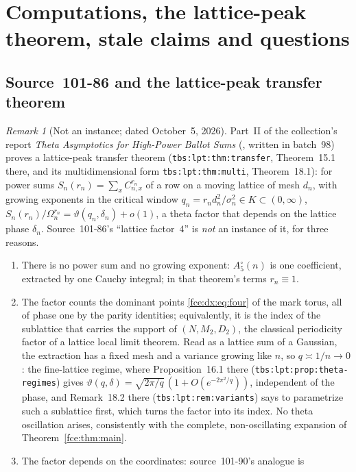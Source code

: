 \documentclass[11pt,a4paper]{article}
\numberwithin{equation}{section}
\theoremstyle{definition}\newtheorem{definition}[theorem]{Definition}
\theoremstyle{remark}\newtheorem{remark}[theorem]{Remark}
\begin{document}
\section{Computations, the lattice-peak theorem, stale claims and questions}\label{fce:dx:sec:end}
\subsection{Source~101-86 and the lattice-peak transfer theorem}\label{fce:dx:sec:lattice}
\begin{remark}[Not an instance; dated October~5, 2026]\label{fce:dx:rem:lattice}
Part~II of the collection's report \emph{Theta Asymptotics for High-Power
Ballot Sums} (,
written in batch~98) proves a lattice-peak transfer theorem
(\texttt{tbs:lpt:thm:transfer}, Theorem~15.1 there, and its multidimensional
form \texttt{tbs:lpt:thm:multi}, Theorem~18.1): for power sums
$S_n(r_n)=\sum_xC_{n,x}^{r_n}$ of a row on a moving lattice of mesh $d_n$,
with growing exponents in the critical window
$q_n=r_nd_n^2/\sigma_n^2\in K\subset(0,\infty)$,
$S_n(r_n)/\Omega_n^{r_n}=\vartheta(q_n,\delta_n)+o(1)$, a theta factor that
depends on the lattice phase $\delta_n$. Source~101-86's ``lattice factor~$4$''
is \emph{not} an instance of it, for three reasons.
\begin{enumerate}[label=(\roman*)]
\item There is no power sum and no growing exponent: $A^\circ_5(n)$ is one
coefficient, extracted by one Cauchy integral; in that theorem's terms
$r_n\equiv1$.
\item The factor counts the dominant points \eqref{fce:dx:eq:four} of the mark
torus, all of phase one by the parity identities; equivalently, it is the
index of the sublattice that carries the support of $(N,M_2,D_2)$, the
classical periodicity factor of a lattice local limit theorem. Read as a
lattice sum of a Gaussian, the extraction has a fixed mesh and a variance
growing like $n$, so $q\asymp1/n\to0$: the fine-lattice regime, where
Proposition~16.1 there (\texttt{tbs:lpt:prop:theta-regimes}) gives
$\vartheta(q,\delta)=\sqrt{2\pi/q}\,(1+O(e^{-2\pi^2/q}))$, independent of the
phase, and Remark~18.2 there (\texttt{tbs:lpt:rem:variants}) says to
parametrize such a sublattice first, which turns the factor into its index.
No theta oscillation arises, consistently with the complete, non-oscillating
expansion of Theorem~\ref{fce:thm:main}.
\item The factor depends on the coordinates: source~101-90's analogue is

\end{enumerate}
\end{remark}
\end{document}
